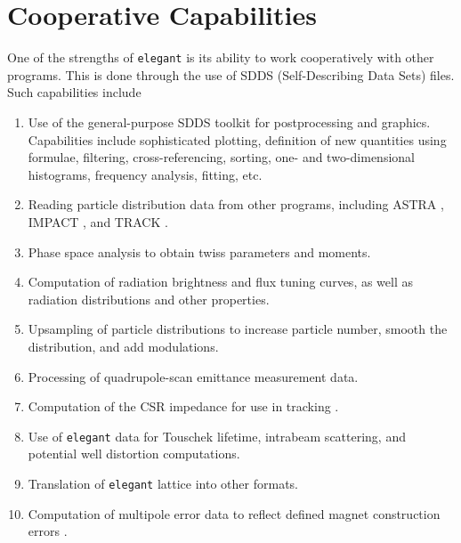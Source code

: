 \documentclass[11pt]{article}
\begin{document}
\section{Cooperative Capabilities}

One of the strengths of {\tt elegant} is its ability to work cooperatively with other programs.
This is done through the use of SDDS (Self-Describing Data Sets\cite{SDDS1,SDDS2}) files.
Such capabilities include
\begin{enumerate}
\item Use of the general-purpose SDDS toolkit for postprocessing and graphics.  Capabilities include
sophisticated plotting, definition of new quantities using formulae, filtering, cross-referencing, sorting,
one- and two-dimensional histograms, frequency analysis, fitting, etc.
\item Reading particle distribution data from other programs, including ASTRA \cite{ASTRA}, IMPACT \cite{IMPACT}, and TRACK \cite{TRACK}.
\item Phase space analysis to obtain twiss parameters and moments.
\item Computation of radiation brightness and flux tuning curves, as well as radiation distributions and other properties.
\item Upsampling of particle distributions to increase particle number, smooth the distribution, and add modulations.
\item Processing of quadrupole-scan emittance measurement data.
\item Computation of the CSR impedance for use in tracking \cite{Warnock}.
\item Use of {\tt elegant} data for Touschek lifetime, intrabeam scattering, and potential well distortion computations.
\item Translation of {\tt elegant} lattice into other formats.
\item Computation of multipole error data to reflect defined magnet construction errors \cite{Halbach_69a}.
\end{enumerate}
\end{document}
